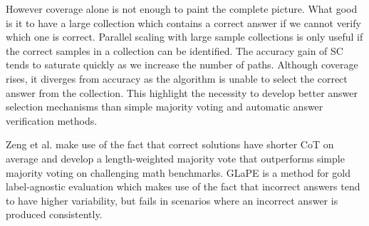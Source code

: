 However coverage alone is not enough to paint the complete picture. What good is it to have a large collection which contains a correct answer
if we cannot verify which one is correct. Parallel scaling with large sample collections is only useful 
if the correct samples in a collection can be identified\cite{brown2024largelanguagemonkeysscaling}\cite{zeng2025revisitingtesttimescalingo1like}.
The accuracy gain of SC tends to saturate quickly as we increase the number of paths\cite{wang2023selfconsistencyimproveschainthought}.
Although coverage rises, it diverges\cite{brown2024largelanguagemonkeysscaling} from accuracy as the algorithm is unable to select the correct answer from the collection.
This highlight the necessity to develop better answer selection mechanisms than simple majority voting and automatic answer verification methods.

Zeng et al.\cite{zeng2025revisitingtesttimescalingo1like} make use of the fact that
correct solutions have shorter CoT on average and develop a length-weighted majority vote that outperforms simple majority voting on challenging math benchmarks. 
GLaPE\cite{zhang2024glapegoldlabelagnosticprompt} is a method for gold label-agnostic evaluation which makes use
of the fact that incorrect answers tend to have higher variability, but fails in scenarios where an incorrect answer is produced consistently. 

